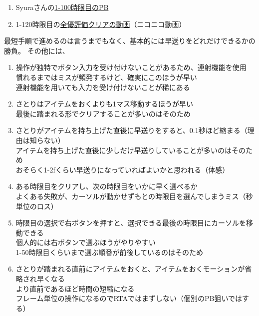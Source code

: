\begin{enumerate}[label={\sarrow}]
\item Syuraさんの\href{https://pastebin.com/0nH3mJSZ}{1-100時限目のPB}
\item 1-120時限目の\href{https://www.nicovideo.jp/watch/sm18710850}{全優評価クリアの動画}（ニコニコ動画）
\end{enumerate}



\clearpage
最短手順で進めるのは言うまでもなく、基本的には早送りをどれだけできるかの勝負。
その他には、
\begin{enumerate}[label={\sarrow}]
\item 操作が独特でボタン入力を受け付けないことがあるため、連射機能を使用\\
      慣れるまではミスが頻発するけど、確実にこのほうが早い\\
      連射機能を用いても入力を受け付けないことが稀にある
\item さとりはアイテムをおくよりも1マス移動するほうが早い\\
      最後に踏まれる形でクリアすることが多いのはそのため
\item さとりがアイテムを持ち上げた直後に早送りをすると、0.1秒ほど縮まる（理由は知らない）\\
      アイテムを持ち上げた直後に少しだけ早送りしていることが多いのはそのため\\
      おそらく1-2fくらい早送りになっていればよいかと思われる（体感）
\item ある時限目をクリアし、次の時限目をいかに早く選べるか\\
      よくある失敗が、カーソルが動かせずもとの時限目を選んでしまうミス（秒単位のロス）
\item 時限目の選択で右ボタンを押すと、選択できる最後の時限目にカーソルを移動できる\\
      個人的には右ボタンで選ぶほうがやりやすい\\
      1-50時限目くらいまで選ぶ順番が前後しているのはそのため
\item さとりが踏まれる直前にアイテムをおくと、アイテムをおくモーションが省略され早くなる\\
      より直前であるほど時間の短縮になる\\
      フレーム単位の操作になるのでRTAではまずしない（個別のPB狙いではする）
\end{enumerate}



